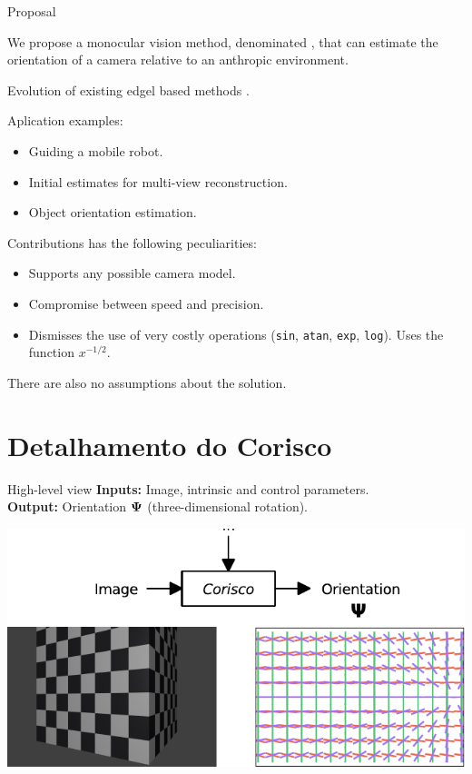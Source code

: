 \begin{frame}{Proposal}
  \begin{overprint}
    \alert<+>{} We propose a \alert<+>{monocular} vision method,
    denominated \corisco, that can estimate the orientation of a camera relative to an anthropic environment.\alert<+>{}

    Evolution of existing edgel based methods \citep{Coughlan2003}.

    Aplication examples:\\
    \begin{itemize}
    \item Guiding a mobile robot.
    \item Initial estimates for multi-view reconstruction.
    \item Object orientation estimation.
    \end{itemize}
  \end{overprint}
\end{frame}


\begin{frame}{Contributions}
  \corisco has the following peculiarities:\\
  \begin{itemize}
  \item Supports any possible camera model.
  \item Compromise between speed and precision.
  \item Dismisses the use of very costly operations ({\tt sin}, {\tt atan},
    {\tt exp}, {\tt log}). Uses the function $x^{-1/2}$.
  \end{itemize}

  There are also no assumptions about the solution.

\end{frame}


\section[2--Corisco]{Detalhamento do Corisco}

\begin{frame}{High-level view}{}
  {\bf Inputs:} Image, intrinsic and control parameters.\\
  {\bf Output:} Orientation ${\boldsymbol{\Psi}}$ (three-dimensional rotation).
  \vfill
  \centerline{\includegraphics[height=11\baselineskip]{cg.pdf}} 
\end{frame}



